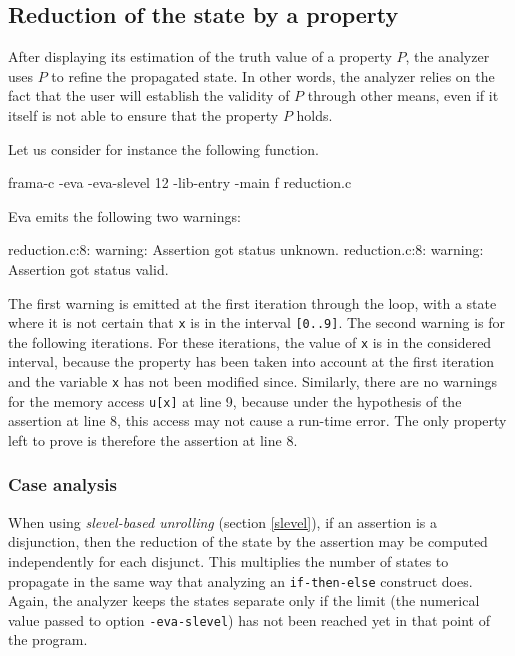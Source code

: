\documentclass[web]{frama-c-book}
\newcommand{\Eva}{\textsf{Eva}}
\begin{document}
\subsection{Reduction of the state by a property}
\label{reduction_proprietes}

After displaying its estimation of the truth value of a property $P$,
the analyzer uses $P$ to refine the propagated state.
In other words, the analyzer relies on the fact that the user will establish
the validity of $P$ through other means, even if it itself is not able to
ensure that the property $P$ holds.

Let us consider for instance the following function.


\begin{shell}
frama-c -eva -eva-slevel 12 -lib-entry -main f reduction.c
\end{shell}

\Eva{} emits the following two warnings:
\begin{logs}
reduction.c:8: warning: Assertion got status unknown.
reduction.c:8: warning: Assertion got status valid.
\end{logs}
The first warning is emitted at the first iteration through the loop,
with a state where it is not certain that \lstinline|x| is in the interval
\lstinline|[0..9]|. The second warning is for the following iterations.
For these iterations, the value of \lstinline|x|
is in the considered interval, because the property has been taken into account
at the first iteration and the variable \lstinline|x| has not been modified since.
Similarly, there are no warnings for the memory access \lstinline|u[x]| at
line 9, because under the hypothesis of the assertion at line 8,
this access may not cause a run-time error. The only property left
to prove is therefore the assertion at line 8.

\subsubsection{Case analysis}

When using {\em slevel-based unrolling} (section \ref{slevel}), if an
assertion is a disjunction, then the reduction of the state by the
assertion may be computed independently for each disjunct.  This
multiplies the number of states to propagate in the same way that
analyzing an \lstinline|if-then-else| construct does.  Again, the
analyzer keeps the states separate only if the limit (the numerical
value passed to option \lstinline|-eva-slevel|) has not been reached yet
in that point of the program.  
\end{document}
